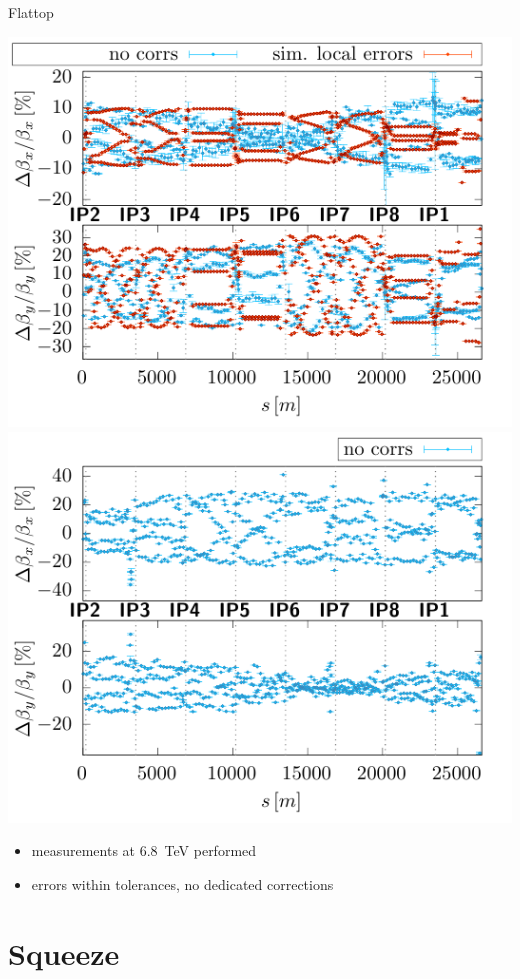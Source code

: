 \documentclass[4pt,usenames,dvipsnames,aspectratio=169]{beamer}
\begin{document}
\begin{frame}{Flattop}
    
    \includegraphics[width=0.49\linewidth]{images/flattop/b1_bb.pdf}
    \hfill
    \includegraphics[width=0.49\linewidth]{images/flattop/b2_bb.pdf}
    \begin{itemize}
        \item measurements at \SI{6.8}{TeV} performed
        \item errors within tolerances, no dedicated corrections
    \end{itemize}
    
\end{frame}

\section{Squeeze}
\end{document}
